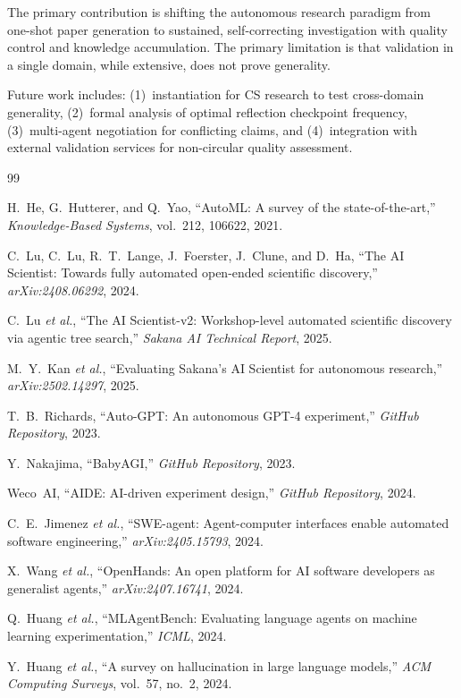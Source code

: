 \documentclass[11pt,a4paper]{article}
\begin{document}
The primary contribution is shifting the autonomous research paradigm from one-shot
paper generation to sustained, self-correcting investigation with quality control
and knowledge accumulation. The primary limitation is that validation in a single
domain, while extensive, does not prove generality.

Future work includes: (1)~instantiation for CS research to test cross-domain
generality, (2)~formal analysis of optimal reflection checkpoint frequency,
(3)~multi-agent negotiation for conflicting claims, and (4)~integration with
external validation services for non-circular quality assessment.

\begin{thebibliography}{99}

H.~He, G.~Hutterer, and Q.~Yao,
``AutoML: A survey of the state-of-the-art,''
\emph{Knowledge-Based Systems}, vol.~212, 106622, 2021.

C.~Lu, C.~Lu, R.~T.~Lange, J.~Foerster, J.~Clune, and D.~Ha,
``The AI Scientist: Towards fully automated open-ended scientific discovery,''
\emph{arXiv:2408.06292}, 2024.

C.~Lu \emph{et al.},
``The AI Scientist-v2: Workshop-level automated scientific discovery via agentic tree search,''
\emph{Sakana AI Technical Report}, 2025.

M.~Y.~Kan \emph{et al.},
``Evaluating Sakana's AI Scientist for autonomous research,''
\emph{arXiv:2502.14297}, 2025.

T.~B.~Richards,
``Auto-GPT: An autonomous GPT-4 experiment,''
\emph{GitHub Repository}, 2023.

Y.~Nakajima,
``BabyAGI,''
\emph{GitHub Repository}, 2023.

Weco~AI,
``AIDE: AI-driven experiment design,''
\emph{GitHub Repository}, 2024.

C.~E.~Jimenez \emph{et al.},
``SWE-agent: Agent-computer interfaces enable automated software engineering,''
\emph{arXiv:2405.15793}, 2024.

X.~Wang \emph{et al.},
``OpenHands: An open platform for AI software developers as generalist agents,''
\emph{arXiv:2407.16741}, 2024.

Q.~Huang \emph{et al.},
``MLAgentBench: Evaluating language agents on machine learning experimentation,''
\emph{ICML}, 2024.

Y.~Huang \emph{et al.},
``A survey on hallucination in large language models,''
\emph{ACM Computing Surveys}, vol.~57, no.~2, 2024.

\end{thebibliography}
\end{document}
